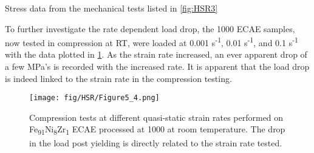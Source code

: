 		\begin{table}[]
			\caption{Stress data from the mechanical tests listed in \ref{fig:HSR3}}
			\captionsetup[table]{position=top}
				
			\label{tab:HSR2}
		\end{table} 
		 
		To further investigate the rate dependent load drop, the 1000 \celsius{}   ECAE samples, now tested in compression at RT, were loaded at 0.001 s\textsuperscript{-1}, 0.01 s\textsuperscript{-1}, and 0.1 s\textsuperscript{-1} with the data plotted in \ref{fig:HSR5}. As the strain rate increased, an ever apparent drop of a few MPa’s is recorded with the increased rate. It is apparent that the load drop is indeed linked to the strain rate in the compression testing.  
		
		\begin{figure}
			\centering
			\texttt{[image: fig/HSR/Figure5\_4.png]}
			\caption[Compression tests at different quasi-static strain rates performed on
			Fe\textsubscript{91}Ni\textsubscript{8}Zr\textsubscript{1 }ECAE processed at 1000 \celsius{} at room temperature.]{Compression tests at different quasi-static strain rates performed on
				Fe\textsubscript{91}Ni\textsubscript{8}Zr\textsubscript{1 }ECAE processed at 1000 \celsius{} at room temperature. The drop in the
				load post yielding is directly related to the strain rate tested.}
			\label{fig:HSR5}
		\end{figure} 
		
